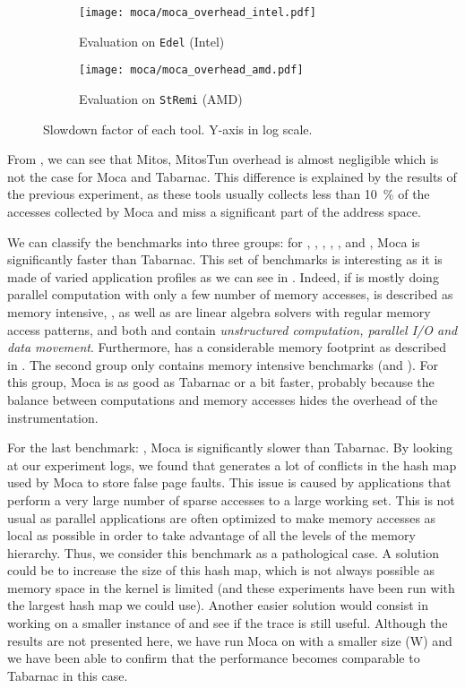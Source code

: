 \begin{figure}[htb]
    \centering
    \begin{subfigure}{.73\linewidth}
        \texttt{[image: moca/moca\_overhead\_intel.pdf]}
        \caption{Evaluation on \texttt{Edel} (Intel)}
        \label{fig:ovh-moca-Intel}
    \end{subfigure}
    \begin{subfigure}{.73\linewidth}
        \texttt{[image: moca/moca\_overhead\_amd.pdf]}
        \caption{Evaluation on \texttt{StRemi} (AMD)}
        \label{fig:ovh-moca-AMD}
    \end{subfigure}
    \caption[Slowdown factor of each tool.]{Slowdown factor of each tool.
    Y-axis in log scale.}
    \label{fig:ovh-moca}
\end{figure}

From , we can see that \gls{Mitos}, MitosTun overhead is almost negligible which is not the case for \gls{Moca} and \gls{Tabarnac}.
This difference is explained by the results of the previous experiment, as these tools usually collects less than \SI{10}{\%} of the accesses collected by \gls{Moca} and miss a significant part of the address space.

We can classify the benchmarks into three groups: for \BT, \CG, \DC,  \EP, \LU, \SP and \UA, \gls{Moca} is significantly faster than \gls{Tabarnac}.
This set of benchmarks is interesting as it is made of varied application profiles as we can see in .
Indeed, if \EP is mostly doing parallel computation with only a few number of memory accesses, \CG is described as memory intensive, \BT, \LU as well as \SP are linear algebra solvers with regular memory access patterns, and both \UA and \DC contain \emph{unstructured computation, parallel I/O and data movement}.
Furthermore, \DC has a considerable memory footprint as described in .
The second group only contains memory intensive benchmarks (\FT and
\IS). For this group, \gls{Moca} is as good as \gls{Tabarnac} or a bit faster, probably
because the balance between computations and memory accesses hides the
overhead of the instrumentation.

For the last benchmark: \MG, \gls{Moca} is significantly slower than \gls{Tabarnac}.
By looking at our experiment logs, we found that \MG generates a lot of conflicts in the hash map used by \gls{Moca} to store false page faults.
This issue is caused by applications that perform a very large number of sparse accesses to a large working set.
This is not usual as parallel applications are often optimized to make memory accesses as local as possible in order to take advantage of all the levels of the memory hierarchy.
Thus, we consider this benchmark as a pathological case.
A solution could be to increase the size of this hash map, which is not always possible as memory space in the kernel is limited (and these experiments have been run with the largest hash map we could use).
Another easier solution would consist in working on a smaller instance of \MG and see if the trace is still useful.
Although the results are not presented here, we have run \gls{Moca} on \MG with a smaller size (W) and we have been able to confirm that the performance becomes comparable to \gls{Tabarnac} in this case.

